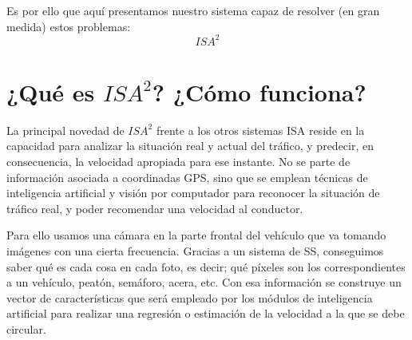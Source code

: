Es por ello que aquí presentamos nuestro sistema capaz de resolver (en gran medida) estos problemas: \[ISA^{2}\]


\section{¿Qué es $ISA^{2}$? ¿Cómo funciona?}


La principal novedad de $ISA^{2}$ frente a los otros sistemas \ac{ISA} reside en la capacidad para analizar la situación real y actual del tráfico, y predecir, en consecuencia, la velocidad apropiada para ese instante. No se parte de información asociada a coordinadas GPS, sino que se emplean técnicas de inteligencia artificial y visión por computador para reconocer la situación de tráfico real, y poder recomendar una velocidad al conductor.


Para ello usamos una cámara en la parte frontal del vehículo que va tomando imágenes con una cierta frecuencia. Gracias a un sistema de \ac{SS}, conseguimos saber qué es cada cosa en cada foto, es decir; qué píxeles son los correspondientes a un vehículo, peatón, semáforo, acera, etc. Con esa información se construye un vector de características que será empleado por los módulos de inteligencia artificial para realizar una regresión o estimación de la velocidad a la que se debe circular.





